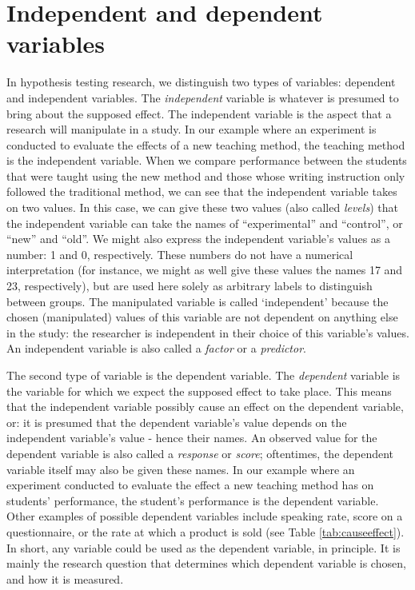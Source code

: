 \documentclass[
]{book}
\begin{document}
\hypertarget{sec:independendependentvariables}{%
\section{Independent and dependent variables}\label{sec:independendependentvariables}}

In hypothesis testing research, we distinguish two types of variables: dependent and independent variables. The \emph{independent} variable is whatever is presumed to bring about the supposed effect. The independent variable is the aspect that a research will manipulate in a study. In our example where an experiment is conducted to evaluate the effects of a new teaching method, the teaching method is the independent variable. When we compare performance between the students that were taught using the new method and those whose writing instruction only followed the traditional method, we can see that the independent variable takes on two values. In this case, we can give these two values (also called \emph{levels}) that the independent variable can take the names of ``experimental'' and ``control'', or ``new'' and ``old''. We might also express the independent variable's values as a number: 1 and 0, respectively. These numbers do not have a numerical interpretation (for instance, we might as well give these values the names 17 and 23, respectively), but are used here solely as arbitrary labels to distinguish between groups. The manipulated variable is called `independent' because the chosen (manipulated) values of this variable are not dependent on anything else in the study: the researcher is independent in their choice of this variable's values. An independent variable is also called a \emph{factor} or a \emph{predictor}.

The second type of variable is the dependent variable. The \emph{dependent} variable is the variable for which we expect the supposed effect to take place. This means that the independent variable possibly cause an effect on the dependent variable, or: it is presumed that the dependent variable's value depends on the independent variable's value - hence their names. An observed value for the dependent variable is also called a \emph{response} or \emph{score}; oftentimes, the dependent variable itself may also be given these names. In our example where an experiment conducted to evaluate the effect a new teaching method has on students' performance, the student's performance is the dependent variable. Other examples of possible dependent variables include speaking rate, score on a questionnaire, or the rate at which a product is sold (see Table \ref{tab:causeeffect}). In short, any variable could be used as the dependent variable, in principle. It is mainly the research question that determines which dependent variable is chosen, and how it is measured.
\end{document}
